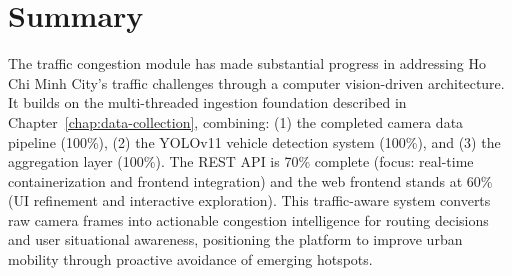 \section{Summary}

The traffic congestion module has made substantial progress in addressing Ho Chi Minh City's traffic challenges through a computer vision-driven architecture. It builds on the multi-threaded ingestion foundation described in Chapter~\ref{chap:data-collection}, combining: (1) the completed camera data pipeline (100\%), (2) the YOLOv11 vehicle detection system (100\%), and (3) the aggregation layer (100\%). The REST API is 70\% complete (focus: real-time containerization and frontend integration) and the web frontend stands at 60\% (UI refinement and interactive exploration). This traffic-aware system converts raw camera frames into actionable congestion intelligence for routing decisions and user situational awareness, positioning the platform to improve urban mobility through proactive avoidance of emerging hotspots.
